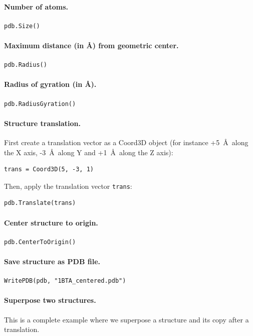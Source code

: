 \documentclass[12pt,a4paper]{article}
\begin{document}
\paragraph{Number of atoms.}
\begin{verbatim}
pdb.Size()
\end{verbatim}


\paragraph{Maximum distance (in \AA) from geometric center.}
\begin{verbatim}
pdb.Radius()
\end{verbatim}


\paragraph{Radius of gyration (in \AA).}
\begin{verbatim}
pdb.RadiusGyration()
\end{verbatim}


\paragraph{Structure translation.}
First create a translation vector as a Coord3D object (for instance +5~\AA\ along the X axis, -3~\AA\ along Y and +1~\AA\ along the Z axis):
\begin{verbatim}
trans = Coord3D(5, -3, 1)
\end{verbatim}
Then, apply the translation vector {\tt trans}:
\begin{verbatim}
pdb.Translate(trans)
\end{verbatim}


\paragraph{Center structure to origin.}
\begin{verbatim}
pdb.CenterToOrigin()
\end{verbatim}


\paragraph{Save structure as PDB file.}
\begin{verbatim}
WritePDB(pdb, "1BTA_centered.pdb")
\end{verbatim}


\paragraph{Superpose two structures.} This is a complete example where we
superpose a structure and its copy after a translation.\\
\end{document}
